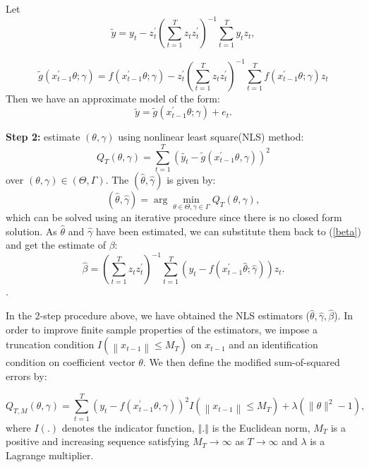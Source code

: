 \documentclass[a4paper,12pt,times,numbered,print,index]{report}
\numberwithin{equation}{section}
\begin{document}
Let  
$$\tilde{y} = y_t -  z_t^{\prime}  \left( \sum_{t=1}^{T}z_t z_t^{\prime}\right)^{-1} \sum_{t=1}^{T}y_t z_t, $$ 

$$\tilde{g} ( x_{t-1}^{\prime }\theta; \gamma) = f\left( x_{t-1}^{\prime }\theta; \gamma\right) - z_t^{\prime} \left( \sum_{t=1}^{T}z_t z_t^{\prime}\right)^{-1} \sum_{t=1}^{T} f\left( x_{t-1}^{\prime }\theta; \gamma\right) z_t$$ 
Then we have an approximate model of the form:
\begin{equation}
\tilde{y} = \tilde{g}\left( x_{t-1}^{\prime }\theta; \gamma\right) + e_t.
\label{trans_model}
\end{equation}

\textbf{Step 2: } estimate $(\theta, \gamma)$ using nonlinear least square(NLS) method:
$$
Q_{T}(\theta, \gamma)=\sum_{t=1}^{T}\left(\tilde{y_{t}}-\tilde{g}\left(x_{t-1}^{\prime} \theta, \gamma\right)\right)^{2}
$$
over $(\theta, \gamma) \in (\Theta, \Gamma)$.
The $(\hat{\theta}, \hat{\gamma})$ is given by:
\begin{equation*}
\left( \widehat{\theta},\widehat{\gamma}\right) =\arg \min_{\theta \in \Theta
	,\gamma \in \Gamma }Q_{T}\left( \theta ,\gamma \right),  \label{nls_c3}
\end{equation*}%
which can be solved using an iterative procedure since there is no closed form solution. As $\hat{\theta}$ and $\hat{\gamma}$ have been estimated, we can substitute them back to (\ref{beta}) and get the estimate of $\beta$:
$$
 \hat{\beta} = \left( \sum_{t=1}^{T}z_t z_t^{\prime}\right)^{-1}\sum_{t=1}^{T}\left( y_t- f\left( x_{t-1}^{\prime }\hat{\theta}; \hat{\gamma}\right)\right) z_t.
$$.

In the 2-step procedure above, we have obtained the NLS estimators ($\widehat{\theta}, \widehat{\gamma}, \widehat{\beta}$). In order to improve finite sample properties of the estimators, we impose a truncation condition $I\left(\left\|x_{t-1}\right\| \leq M_T\right)$ on $x_{t-1}$ and an identification condition on coefficient vector $\theta$. We then define the modified sum-of-squared errors by:

$$
Q_{T, M}(\theta, \gamma)=\sum_{t=1}^{T}\left(y_{t}-f\left(x_{t-1}^{\prime} \theta, \gamma\right)\right)^{2} I\left(\left\|x_{t-1}\right\| \leq M_{T}\right)+\lambda\left(\|\theta\|^{2}-1\right),
$$
where $I\left( .\right) $ denotes the indicator function, $%
\left\Vert .\right\Vert $ is the Euclidean norm, $M_T$ is a positive and increasing sequence satisfying $ M_{T}\rightarrow \infty $ as $T \rightarrow \infty $ and $\lambda $ is a Lagrange
multiplier. 
\end{document}
